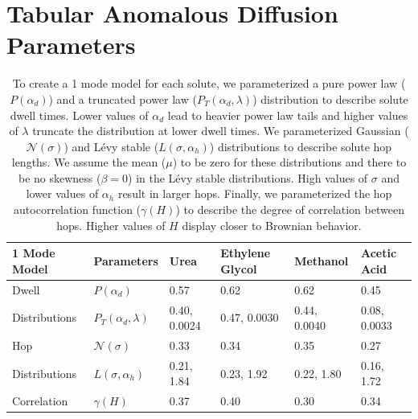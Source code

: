 \documentclass{article}
\begin{document}
  \section{Tabular Anomalous Diffusion Parameters}\label{section:tabular_AD_params}
  
  \begin{table}[h]
  \centering
  \begin{tabular}{|M{2cm}|M{1.65cm}|M{1.95cm}|M{1.95cm}|M{1.95cm}|M{1.95cm}|}
   Mode Model  & Parameters                & Urea         & Ethylene Glycol &   Methanol   & Acetic Acid  \\\hline
  Dwell         & $P(\alpha_d)$             & 0.57         & 0.62            & 0.62         & 0.45         \\
  Distributions & $P_T(\alpha_d, \lambda)$  & 0.40, 0.0024 & 0.47, 0.0030    & 0.44, 0.0040 & 0.08, 0.0033 \\\hline
  Hop           & $\mathcal{N}(\sigma)$     & 0.33         & 0.34            & 0.35         & 0.27         \\
  Distributions & $L(\sigma, \alpha_h)$     & 0.21, 1.84   & 0.23, 1.92      & 0.22, 1.80   & 0.16, 1.72   \\\hline
  Correlation   & $\gamma(H)$               & 0.37         & 0.40            & 0.30         & 0.34         \\
  \hline 
  \end{tabular}
  \caption{To create a 1 mode model for each solute, we parameterized a pure power
  law ($P(\alpha_d)$) and a truncated power law ($P_T(\alpha_d, \lambda)$) distribution 
  to describe solute dwell times. Lower values of $\alpha_d$ lead to heavier power 
  law tails and higher values of $\lambda$ truncate the distribution at lower
  dwell times. We parameterized Gaussian ($\mathcal{N}(\sigma)$) and L\'evy stable 
  ($L(\sigma, \alpha_h)$) distributions to describe solute hop lengths. We assume
  the mean ($\mu$) to be zero for these distributions and there to be no skewness ($\beta=0$)
  in the L\'evy stable distributions. High values of $\sigma$ and lower values of
  $\alpha_h$ result in larger hops. Finally, we parameterized the hop autocorrelation
  function ($\gamma(H)$) to describe the degree of correlation between hops. 
  Higher values of $H$ display closer to Brownian behavior.}\label{table:sfbm_params}
  \end{table}
  
\end{document}
